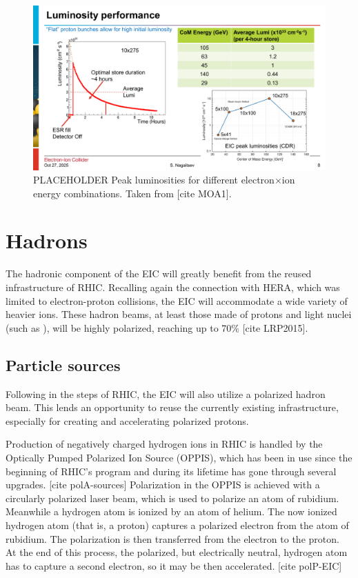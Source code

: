 \begin{figure}[ht]
    \centering
    \includegraphics[width=.7\linewidth]{img/luminosity2_placeholder.pdf}
    \caption{PLACEHOLDER Peak luminosities for different electron$\times$ion energy combinations. Taken from [cite MOA1].} %
    \label{fig:eic:lumi}
\end{figure}


\section{Hadrons}
The hadronic component of the EIC will greatly benefit from the reused infrastructure of RHIC. Recalling again the connection with HERA, which was limited to electron-proton collisions, the EIC will accommodate a wide variety of heavier ions. These hadron beams, at least those made of protons and light nuclei (such as ), will be highly polarized, reaching up to 70\% [cite LRP2015].

\subsection{Particle sources}
Following in the steps of RHIC, the EIC will also utilize a polarized hadron beam. This lends an opportunity to reuse the currently existing infrastructure, especially for creating and accelerating polarized protons. 

Production of negatively charged hydrogen ions in RHIC is handled by the Optically Pumped Polarized Ion Source (OPPIS), which has been in use since the beginning of RHIC's program and during its lifetime has gone through several upgrades. [cite polA-sources] Polarization in the OPPIS is achieved with a circularly polarized laser beam, which is used to polarize an atom of rubidium. Meanwhile a hydrogen atom is ionized by an atom of helium. The now ionized hydrogen atom (that is, a proton) captures a polarized electron from the atom of rubidium. The polarization is then transferred from the electron to the proton. At the end of this process, the polarized, but electrically neutral, hydrogen atom has to capture a second electron, so it may be then accelerated. [cite polP-EIC]


